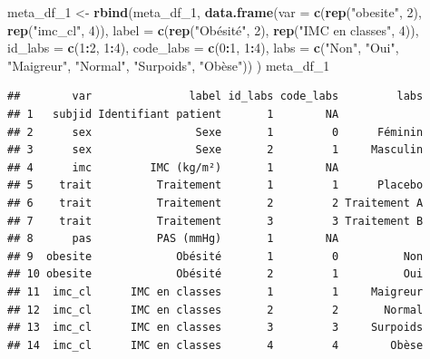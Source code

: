 \documentclass[
]{book}
\newenvironment{Shaded}{\begin{snugshade}}{\end{snugshade}}
\newcommand{\AttributeTok}[1]{\textcolor[rgb]{0.13,0.29,0.53}{#1}}
\newcommand{\DecValTok}[1]{\textcolor[rgb]{0.00,0.00,0.81}{#1}}
\newcommand{\FunctionTok}[1]{\textcolor[rgb]{0.13,0.29,0.53}{\textbf{#1}}}
\newcommand{\NormalTok}[1]{#1}
\newcommand{\OtherTok}[1]{\textcolor[rgb]{0.56,0.35,0.01}{#1}}
\newcommand{\SpecialCharTok}[1]{\textcolor[rgb]{0.81,0.36,0.00}{\textbf{#1}}}
\newcommand{\StringTok}[1]{\textcolor[rgb]{0.31,0.60,0.02}{#1}}
\begin{document}
\begin{Shaded}
\begin{Highlighting}[]
\NormalTok{meta\_df\_1 }\OtherTok{\textless{}{-}} \FunctionTok{rbind}\NormalTok{(meta\_df\_1, }
                   \FunctionTok{data.frame}\NormalTok{(}\AttributeTok{var =} \FunctionTok{c}\NormalTok{(}\FunctionTok{rep}\NormalTok{(}\StringTok{"obesite"}\NormalTok{, }\DecValTok{2}\NormalTok{), }
                                      \FunctionTok{rep}\NormalTok{(}\StringTok{"imc\_cl"}\NormalTok{, }\DecValTok{4}\NormalTok{)),}
                              \AttributeTok{label =} \FunctionTok{c}\NormalTok{(}\FunctionTok{rep}\NormalTok{(}\StringTok{"Obésité"}\NormalTok{, }\DecValTok{2}\NormalTok{), }
                                        \FunctionTok{rep}\NormalTok{(}\StringTok{"IMC en classes"}\NormalTok{, }\DecValTok{4}\NormalTok{)),}
                              \AttributeTok{id\_labs =} \FunctionTok{c}\NormalTok{(}\DecValTok{1}\SpecialCharTok{:}\DecValTok{2}\NormalTok{, }\DecValTok{1}\SpecialCharTok{:}\DecValTok{4}\NormalTok{),}
                              \AttributeTok{code\_labs =} \FunctionTok{c}\NormalTok{(}\DecValTok{0}\SpecialCharTok{:}\DecValTok{1}\NormalTok{, }\DecValTok{1}\SpecialCharTok{:}\DecValTok{4}\NormalTok{),}
                              \AttributeTok{labs =} \FunctionTok{c}\NormalTok{(}\StringTok{"Non"}\NormalTok{, }\StringTok{"Oui"}\NormalTok{,}
                                       \StringTok{"Maigreur"}\NormalTok{, }\StringTok{"Normal"}\NormalTok{, }\StringTok{"Surpoids"}\NormalTok{, }\StringTok{"Obèse"}\NormalTok{))}
\NormalTok{                   )}
\NormalTok{meta\_df\_1}
\end{Highlighting}
\end{Shaded}

\begin{verbatim}
##        var               label id_labs code_labs         labs
## 1   subjid Identifiant patient       1        NA             
## 2      sex                Sexe       1         0      Féminin
## 3      sex                Sexe       2         1     Masculin
## 4      imc         IMC (kg/m²)       1        NA             
## 5    trait          Traitement       1         1      Placebo
## 6    trait          Traitement       2         2 Traitement A
## 7    trait          Traitement       3         3 Traitement B
## 8      pas          PAS (mmHg)       1        NA             
## 9  obesite             Obésité       1         0          Non
## 10 obesite             Obésité       2         1          Oui
## 11  imc_cl      IMC en classes       1         1     Maigreur
## 12  imc_cl      IMC en classes       2         2       Normal
## 13  imc_cl      IMC en classes       3         3     Surpoids
## 14  imc_cl      IMC en classes       4         4        Obèse
\end{verbatim}
\end{document}
